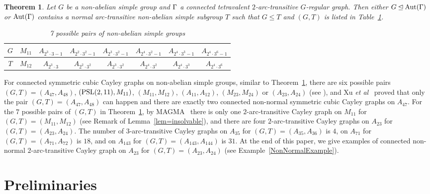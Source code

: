 \documentclass[12pt]{article}
\newtheorem{theorem}[lem]{Theorem}%
\def\PSL{\hbox{\rm PSL}}\def\PSU{\hbox{\rm PSU}}
\def\Aut{\hbox{\rm Aut}}
\begin{document}
\begin{theorem}\label{theo=main}
Let $G$ be a non-abelian simple group and $\Gamma$ a connected tetravalent $2$-arc-transitive $G$-regular graph. Then either $G\unlhd \Aut(\G)$ or $\Aut(\G)$ contains a normal arc-transitive non-abelian simple subgroup $T$ such that $G\leq T$ and $(G,T)$ is listed in Table~\ref{table=1}.
\begin{table}[ht]
\begin{center}
\begin{tabular}{|c|c|c|c|c|c|c|c|}

\hline
$G$  & $M_{11}$ & $A_{2^3\cdot 3-1}$  &$A_{2^2\cdot 3^2-1}$  & $A_{2^3\cdot 3^2-1}$  & $A_{2^4\cdot 3^2-1}$  &$A_{2^4\cdot 3^3-1}$  &$A_{2^4\cdot 3^6-1}$    \\
\hline
$T$  & $M_{12}$ & $A_{2^3\cdot 3}$   & $A_{2^2\cdot 3^2}$ & $A_{2^3\cdot 3^2}$  & $A_{2^4\cdot 3^2}$ & $A_{2^4\cdot 3^3}$  & $A_{2^4\cdot 3^6}$   \\
\hline
\end{tabular}
\end{center}
\vskip -0.5cm
\caption{{7 possible pairs of non-abelian simple groups}}\label{table=1}
\end{table}
\end{theorem}

For connected  symmetric cubic Cayley graphs on non-abelian simple groups, similar to Theorem~\ref{theo=main}, there are six possible pairs $(G,T)=(A_{47},A_{48})$, $(\PSL(2,11),M_{11})$, $(M_{11},M_{12})$, $(A_{11}, A_{12})$, $(M_{23},M_{24})$ or $(A_{23},A_{24})$ (see \cite[Theorem 7.1.3]{CHLi}), and Xu {\em et al}~\cite{XFWX2005, XFWX} proved that only the pair $(G,T)=(A_{47},A_{48})$ can happen and there are exactly two connected non-normal symmetric cubic Cayley graphs on $A_{47}$. For the $7$ possible pairs of $(G,T)$ in Theorem~\ref{theo=main}, by MAGMA~\cite{magma} there is only one $2$-arc-transitive Cayley graph on $M_{11}$ for $(G,T)=(M_{11},M_{12})$ (see  Remark of Lemma~\ref{lem=insolvable}), and there are four $2$-arc-transitive Cayley graphs on $A_{23}$ for $(G,T)=(A_{23},A_{24})$. The number of $3$-arc-transitive Cayley graphs on $A_{35}$ for $(G,T)=(A_{35},A_{36})$ is $4$, on $A_{71}$ for $(G,T)=(A_{71},A_{72})$ is $18$, and on $A_{143}$ for $(G,T)=(A_{143},A_{144})$ is $31$. At the end of this paper, we give examples of connected non-normal $2$-arc-transitive Cayley graph on $A_{23}$ for $(G,T)=(A_{23},A_{24})$ (see Example~\ref{NonNormalExample}).

\section{Preliminaries}
\end{document}
